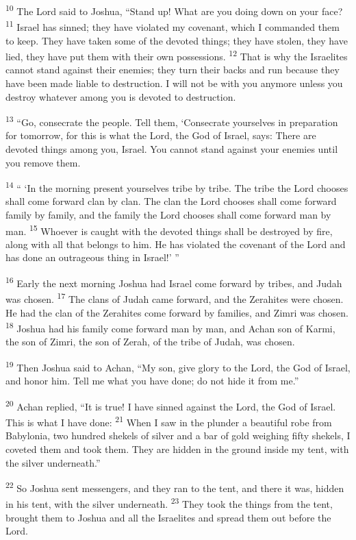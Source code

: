 \documentclass[12pt,twoside]{article}
\newcommand{\vs}[1]{\textsuperscript{#1}}
\begin{document}
\vs{10} The Lord said to Joshua, ``Stand up! What are you doing down on your face?
\vs{11} Israel has sinned; they have violated my covenant, which I commanded them to keep. They have taken some of the devoted things; they have stolen, they have lied, they have put them with their own possessions.
\vs{12} That is why the Israelites cannot stand against their enemies; they turn their backs and run because they have been made liable to destruction. I will not be with you anymore unless you destroy whatever among you is devoted to destruction.

\vs{13} ``Go, consecrate the people. Tell them, `Consecrate yourselves in preparation for tomorrow, for this is what the Lord, the God of Israel, says: There are devoted things among you, Israel. You cannot stand against your enemies until you remove them.

\vs{14} `` `In the morning present yourselves tribe by tribe. The tribe the Lord chooses shall come forward clan by clan. The clan the Lord chooses shall come forward family by family, and the family the Lord chooses shall come forward man by man.
\vs{15} Whoever is caught with the devoted things shall be destroyed by fire, along with all that belongs to him. He has violated the covenant of the Lord and has done an outrageous thing in Israel!' ''

\vs{16} Early the next morning Joshua had Israel come forward by tribes, and Judah was chosen.
\vs{17} The clans of Judah came forward, and the Zerahites were chosen. He had the clan of the Zerahites come forward by families, and Zimri was chosen.
\vs{18} Joshua had his family come forward man by man, and Achan son of Karmi, the son of Zimri, the son of Zerah, of the tribe of Judah, was chosen.

\vs{19} Then Joshua said to Achan, ``My son, give glory to the Lord, the God of Israel, and honor him. Tell me what you have done; do not hide it from me.''

\vs{20} Achan replied, ``It is true! I have sinned against the Lord, the God of Israel. This is what I have done:
\vs{21} When I saw in the plunder a beautiful robe from Babylonia, two hundred shekels of silver and a bar of gold weighing fifty shekels, I coveted them and took them. They are hidden in the ground inside my tent, with the silver underneath.''

\vs{22} So Joshua sent messengers, and they ran to the tent, and there it was, hidden in his tent, with the silver underneath.
\vs{23} They took the things from the tent, brought them to Joshua and all the Israelites and spread them out before the Lord.
\end{document}
